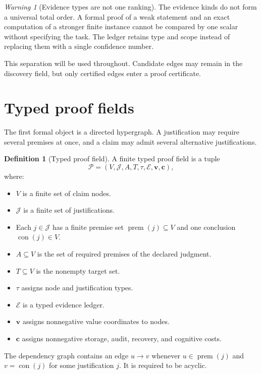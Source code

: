 \documentclass[11pt,oneside]{article}
\theoremstyle{definition}
\newtheorem{definition}[theorem]{Definition}
\theoremstyle{remark}
\newtheorem{warning}[theorem]{Warning}
\newcommand{\Pcal}{\mathcal P}
\newcommand{\Jcal}{\mathcal J}
\newcommand{\Ecal}{\mathcal E}
\begin{document}
\begin{warning}[Evidence types are not one ranking]
The evidence kinds do not form a universal total order. A formal proof of a weak statement and an exact computation of a stronger finite instance cannot be compared by one scalar without specifying the task. The ledger retains type and scope instead of replacing them with a single confidence number.
\end{warning}

This separation will be used throughout. Candidate edges may remain in the discovery field, but only certified edges enter a proof certificate.

\section{Typed proof fields}

The first formal object is a directed hypergraph. A justification may require several premises at once, and a claim may admit several alternative justifications.

\begin{definition}[Typed proof field]
A finite typed proof field is a tuple
\[
\Pcal=(V,\Jcal,A,T,\tau,\Ecal,\mathbf v,\mathbf c),
\]
where:
\begin{itemize}
\item $V$ is a finite set of claim nodes.
\item $\Jcal$ is a finite set of justifications.
\item Each $j\in\Jcal$ has a finite premise set $\operatorname{prem}(j)\subseteq V$ and one conclusion $\operatorname{con}(j)\in V$.
\item $A\subseteq V$ is the set of required premises of the declared judgment.
\item $T\subseteq V$ is the nonempty target set.
\item $\tau$ assigns node and justification types.
\item $\Ecal$ is a typed evidence ledger.
\item $\mathbf v$ assigns nonnegative value coordinates to nodes.
\item $\mathbf c$ assigns nonnegative storage, audit, recovery, and cognitive costs.
\end{itemize}
The dependency graph contains an edge $u\to v$ whenever $u\in\operatorname{prem}(j)$ and $v=\operatorname{con}(j)$ for some justification $j$. It is required to be acyclic.
\end{definition}
\end{document}
